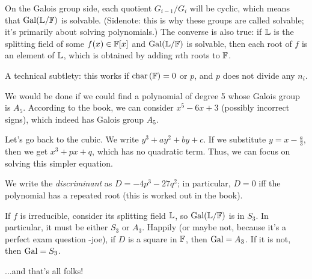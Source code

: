On the Galois group side, each quotient $ G_{i-1}/G_{i} $ will be cyclic, which
means that $ \operatorname{Gal}(\mathbb{L}/\mathbb{F}) $ is solvable. (Sidenote: this is why these groups are
called solvable; it's primarily about solving polynomials.) The converse is also
true: if $ \mathbb{L} $ is the splitting field of some $ f(x) \in \mathbb{F}[x] $ and
$ \operatorname{Gal}(\mathbb{L}/\mathbb{F}) $ is solvable, then each root of $ f $ is an element of $ \mathbb{L} $,
which is obtained by adding $ n $th roots to $ \mathbb{F} $.

A technical subtlety: this works if $ \operatorname{char\,}(\mathbb{F}) = 0 $ or $ p $, and $ p $ does
not divide any $ n_{i} $.

We would be done if we could find a polynomial of degree 5 whose Galois group is
$ A_{5} $. According to the book, we can consider $ x^{5}-6x+3 $ (possibly
incorrect signs), which indeed has Galois group $ A_{5} $.

Let's go back to the cubic. We write $ y^{3}+ay^{2}+by+c $. If we substitute
$ y = x - \frac{a}{3} $, then we get $ x^{3}+px+q $, which has no quadratic term.
Thus, we can focus on solving this simpler equation.

We write the \textit{discriminant} as $ D = -4p^{3}-27q^{2} $; in particular,
$ D = 0 $ iff the polynomial has a repeated root (this is worked out in the
book).

If $ f $ is irreducible, consider its splitting field $ \mathbb{L} $, so
$ \operatorname{Gal}(\mathbb{L}/\mathbb{F}) $ is in $ S_{3} $. In particular, it must be either $ S_{3} $ or
$ A_{3} $. Happily (or maybe not, because it's a perfect exam question -joe), if
$ D $ is a square in $ \mathbb{F} $, then $ \operatorname{Gal} = A_{3} $. If it is not, then $ \operatorname{Gal}
= S_{3} $.

...and that's all folks!
